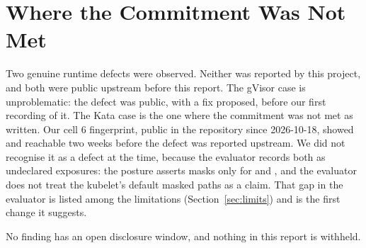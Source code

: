 \section{Where the Commitment Was Not Met}

Two genuine runtime defects were observed. Neither was reported by this project, and both were public upstream before this report. The gVisor case is unproblematic: the defect was public, with a fix proposed, before our first recording of it. The Kata case is the one where the commitment was not met as written. Our cell 6 fingerprint, public in the repository since 2026-10-18, showed  and  reachable two weeks before the defect was reported upstream. We did not recognise it as a defect at the time, because the evaluator records both as undeclared exposures: the posture asserts masks only for  and , and the evaluator does not treat the kubelet's default masked paths as a claim. That gap in the evaluator is listed among the limitations (Section~\ref{sec:limits}) and is the first change it suggests.

No finding has an open disclosure window, and nothing in this report is withheld.
